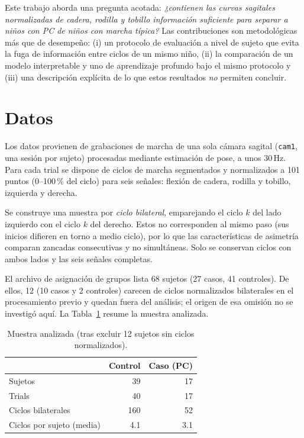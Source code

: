 \documentclass[10pt,twocolumn,a4paper]{article}
\begin{document}
Este trabajo aborda una pregunta acotada: \emph{¿contienen las curvas sagitales normalizadas de cadera, rodilla y tobillo información suficiente para separar a niños con PC de niños con marcha típica?} Las contribuciones son metodológicas más que de desempeño: (i) un protocolo de evaluación a nivel de sujeto que evita la fuga de información entre ciclos de un mismo niño, (ii) la comparación de un modelo interpretable y uno de aprendizaje profundo bajo el mismo protocolo y (iii) una descripción explícita de lo que estos resultados \emph{no} permiten concluir.

\section{Datos}

Los datos provienen de grabaciones de marcha de una sola cámara sagital (\texttt{cam1}, una sesión por sujeto) procesadas mediante estimación de pose, a unos 30\,Hz. Para cada trial se dispone de ciclos de marcha segmentados y normalizados a 101 puntos (0--100\,\% del ciclo) para seis señales: flexión de cadera, rodilla y tobillo, izquierda y derecha.

Se construye una muestra por \emph{ciclo bilateral}, emparejando el ciclo $k$ del lado izquierdo con el ciclo $k$ del derecho. Estos no corresponden al mismo paso (sus inicios difieren en torno a medio ciclo), por lo que las características de asimetría comparan zancadas consecutivas y no simultáneas. Solo se conservan ciclos con ambos lados y las seis señales completas.

El archivo de asignación de grupos lista 68 sujetos (27 casos, 41 controles). De ellos, 12 (10 casos y 2 controles) carecen de ciclos normalizados bilaterales en el procesamiento previo y quedan fuera del análisis; el origen de esa omisión no se investigó aquí. La Tabla~\ref{tab:datos} resume la muestra analizada.

\begin{table}[t]
\centering\small
\caption{Muestra analizada (tras excluir 12 sujetos sin ciclos normalizados).}
\label{tab:datos}
\begin{tabular}{lrr}
\toprule
 & Control & Caso (PC) \\
\midrule
Sujetos & 39 & 17 \\
Trials & 40 & 17 \\
Ciclos bilaterales & 160 & 52 \\
Ciclos por sujeto (media) & 4.1 & 3.1 \\
\bottomrule
\end{tabular}
\end{table}
\end{document}
